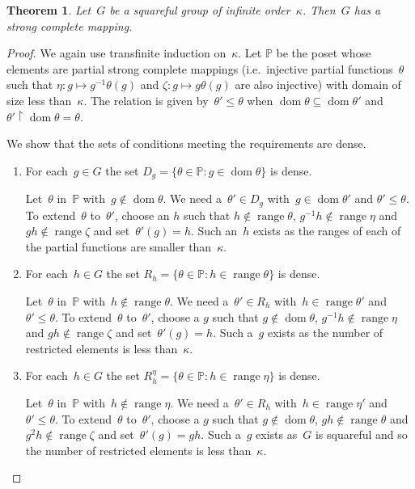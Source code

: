 \documentclass[12pt,a4paper]{article}
\newtheorem{thm}{Theorem}[section]
\DeclareMathOperator{\dom}{dom}
\DeclareMathOperator{\ran}{range}
\newcommand{\rest}{\mathbin{\upharpoonright}}
\renewcommand{\P}{\mathbb{P}}
\begin{document}
\begin{thm}\label{thm:squarefulSCM}
Let~$G$ be a squareful group of infinite order~$\kappa$.  Then~$G$ has a strong complete mapping.
\end{thm}

\begin{proof}
We again use transfinite induction on~$\kappa$.   Let $\P$ be the poset whose elements are partial strong complete mappings (i.e.~injective partial functions~$\theta$ such that $\eta: g \mapsto g^{-1}\theta(g)$ and $\zeta: g \mapsto g\theta(g)$ are also injective) with domain of size less than~$\kappa$.  The relation is given by~$\theta' \leq \theta$ when $\dom \theta \subseteq \dom \theta'$ and $\theta' \rest \dom \theta = \theta$.

We show that the sets of conditions meeting the requirements are dense.

\begin{enumerate}

\item For each~$g \in G$ the set  $D_g = \{ \theta \in \P : g \in \dom \theta \}$ is dense.

Let~$\theta$ in~$\P$ with~$g \not\in \dom \theta$.  We need a~$\theta' \in D_g$ with~$g \in \dom \theta'$ and $\theta' \leq \theta$.  To extend~$\theta$ to~$\theta'$, choose an $h$ such that $h \not\in \ran \theta$, $g^{-1}h \not\in \ran \eta$ and $gh \not\in \ran \zeta$ and set~$\theta'(g) = h$.  Such an~$h$ exists as the ranges of each of the partial functions are smaller than~$\kappa$.


\item For each~$h \in G$ the set  $R_h = \{ \theta \in \P : h \in \ran \theta \}$ is dense.

Let~$\theta$ in~$\P$ with~$h \not\in \ran \theta$.  We need a~$\theta' \in R_h$ with~$h \in \ran \theta'$ and $\theta' \leq \theta$.
To extend~$\theta$ to~$\theta'$,  choose a $g$ such that $g \not\in \dom \theta$, $g^{-1}h \not\in \ran \eta$ and $gh \not\in \ran \zeta$ and set~$\theta'(g) = h$.  Such a~$g$ exists as the number of restricted elements is less than~$\kappa$.


\item For each~$h \in G$ the set  $R_h^{\eta} = \{ \theta \in \P : h \in \ran \eta \}$ is dense.

Let~$\theta$ in~$\P$ with~$h \not\in \ran \eta$.  We need a~$\theta' \in R_h$ with~$h \in \ran \eta'$ and $\theta' \leq \theta$.
To extend~$\theta$ to~$\theta'$,  choose a $g$ such that $g \not\in \dom \theta$, $gh \not\in \ran \theta$ and $g^2h \not\in \ran \zeta$ and set~$\theta'(g) = gh$.  Such a~$g$ exists as~$G$ is squareful and so the number of restricted elements is less than~$\kappa$.



\end{enumerate}
\end{proof}
\end{document}
